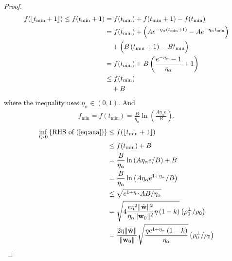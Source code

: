 \documentclass[pdflatex,sn-basic]{sn-jnl}%
\theoremstyle{thmstyleone}%
\begin{document}
\begin{appendices}
\begin{proof}
  \begin{equation*}
  \begin{aligned}
    f(\lfloor t_{\min} + 1 \rfloor) 
    \le 
    f(t_{\min} + 1)
    & = 
    f(t_{\min}) + f(t_{\min} + 1) - f(t_{\min})
    \\ & = 
    f(t_{\min})
    +
    \Bigl(
      A e^{-\eta_{\alpha} \left(t_{\min} + 1\right)}
      -
      A e^{-\eta_{\alpha} t_{\min}}
    \Bigr)
    \\ & \quad +
    \Bigl(
      B \left(t_{\min} + 1\right)
      -
      B t_{\min}
    \Bigr)
    \\ & = 
    f(t_{\min})
    +
    B \left(
      \frac{e^{-\eta_{\alpha}} - 1}{\eta_{\alpha}} + 1
    \right)
    \\ & \le 
    f(t_{\min})
    \\ & \quad + B
  \end{aligned}
  \end{equation*}
  where the inequality uses $\eta_{\alpha} \in (0, 1)$.
  And
  \begin{equation*}
  \begin{aligned}
    f_{\min} = f(t_{\min})
    =
    \frac{B}{\eta_{\alpha}}
    \ln\!\left(
      \frac{A \eta_{\alpha} e}{B}
    \right).
  \end{aligned}
  \end{equation*}
  \begin{equation}\label{eq:bbb}
  \begin{aligned}
    \inf_{t > 0} \left\{
      \text{RHS of }(\ref{eq:aaa})
    \right\}
    & \le
    f(\lfloor t_{\min} + 1 \rfloor) 
    \\ & \le 
    f(t_{\min}) + B 
    \\ & = 
    \frac{B}{\eta_{\alpha}}
    \ln\left( A \eta_{\alpha} e / B \right) + B 
    \\ & = 
    \frac{B}{\eta_{\alpha}}
    \ln\left( A \eta_{\alpha} e^{1+\eta_{\alpha}} / B \right)
    \\ & \le 
    \sqrt{e^{1+\eta_{\alpha}} A B / \eta_{\alpha}}
    \\ & =
    \sqrt{
      4 \frac{e \eta^{2} \Vert \hat{\mathbf{w}} \Vert^2 }{\eta_\alpha \Vert \mathbf{w}_0 \Vert^2} 
      \eta \left( 1 - k \right)
    }
    \left(\rho_{0}^{\perp} / \rho_0\right)
    \\ & =
    \frac{2\eta \Vert \hat{\mathbf{w}} \Vert }{\Vert \mathbf{w}_0 \Vert} 
    \sqrt{
      \frac{\eta e^{1+\eta_{\alpha}} \left( 1 - k \right)}{\eta_\alpha}
    }
    \left(\rho_{0}^{\perp} / \rho_0\right)
  \end{aligned}
  \end{equation}


\end{proof}
\end{appendices}
\end{document}
